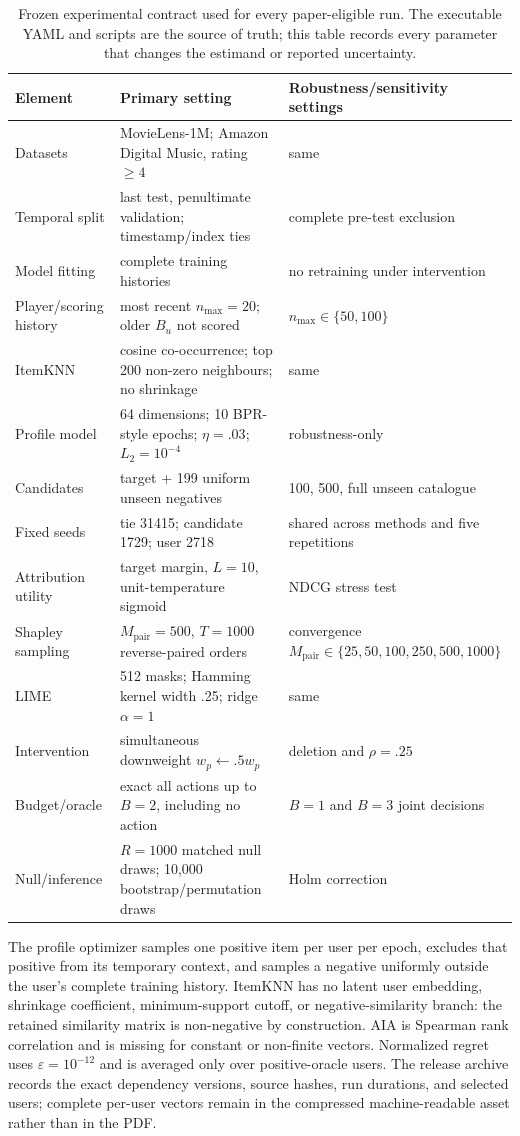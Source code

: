 \documentclass[pdflatex,sn-mathphys-num]{sn-jnl}
\begin{document}
\begin{table}[ht]
\centering\scriptsize
\caption{Frozen experimental contract used for every paper-eligible run. The executable YAML and scripts are the source of truth; this table records every parameter that changes the estimand or reported uncertainty.}
\label{tab:app-contract}
\begin{tabular}{@{}p{.20\linewidth}p{.35\linewidth}p{.37\linewidth}@{}}
\toprule
Element & Primary setting & Robustness/sensitivity settings\\
\midrule
Datasets & MovieLens-1M; Amazon Digital Music, rating $\ge4$ & same\\
Temporal split & last test, penultimate validation; timestamp/index ties & complete pre-test exclusion\\
Model fitting & complete training histories & no retraining under intervention\\
Player/scoring history & most recent $n_{\max}=20$; older $B_u$ not scored & $n_{\max}\in\{50,100\}$\\
ItemKNN & cosine co-occurrence; top 200 non-zero neighbours; no shrinkage & same\\
Profile model & 64 dimensions; 10 BPR-style epochs; $\eta=.03$; $L_2=10^{-4}$ & robustness-only\\
Candidates & target + 199 uniform unseen negatives & 100, 500, full unseen catalogue\\
Fixed seeds & tie 31415; candidate 1729; user 2718 & shared across methods and five repetitions\\
Attribution utility & target margin, $L=10$, unit-temperature sigmoid & NDCG stress test\\
Shapley sampling & $M_{\mathrm{pair}}=500$, $T=1000$ reverse-paired orders & convergence $M_{\mathrm{pair}}\in\{25,50,100,250,500,1000\}$\\
LIME & 512 masks; Hamming kernel width .25; ridge $\alpha=1$ & same\\
Intervention & simultaneous downweight $w_p\leftarrow.5w_p$ & deletion and $\rho=.25$\\
Budget/oracle & exact all actions up to $B=2$, including no action & $B=1$ and $B=3$ joint decisions\\
Null/inference & $R=1000$ matched null draws; 10,000 bootstrap/permutation draws & Holm correction\\
\bottomrule
\end{tabular}
\end{table}

The profile optimizer samples one positive item per user per epoch, excludes that positive from its temporary context, and samples a negative uniformly outside the user's complete training history. ItemKNN has no latent user embedding, shrinkage coefficient, minimum-support cutoff, or negative-similarity branch: the retained similarity matrix is non-negative by construction. AIA is Spearman rank correlation and is missing for constant or non-finite vectors. Normalized regret uses $\varepsilon=10^{-12}$ and is averaged only over positive-oracle users. The release archive records the exact dependency versions, source hashes, run durations, and selected users; complete per-user vectors remain in the compressed machine-readable asset rather than in the PDF.
\end{document}
